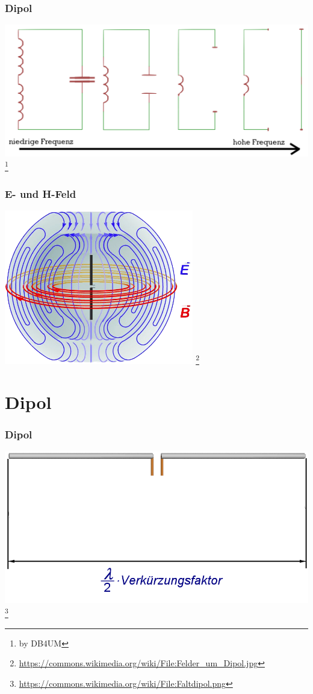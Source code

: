 \begin{frame}
    \frametitle{Dipol}
    \begin{center}
        \includegraphics[width=1\textwidth]{e11/dipol_entstehung.png}
        \footnote{\tiny by DB4UM}
	\end{center}
\end{frame}

\begin{frame}
    \frametitle{E- und H-Feld}
    \begin{center}
        \includegraphics[width=0.62\textwidth]{e11/Felder_um_Dipol.png}
        \footnote{\tiny \url{https://commons.wikimedia.org/wiki/File:Felder_um_Dipol.jpg}}
	\end{center}
\end{frame}


\section*{Dipol}

\begin{frame}
    \frametitle{Dipol}
    \begin{center}
        \includegraphics[width=1\textwidth]{e11/Faltdipol.png}
        \footnote{\tiny \url{https://commons.wikimedia.org/wiki/File:Faltdipol.png}}
	\end{center}
\end{frame}


